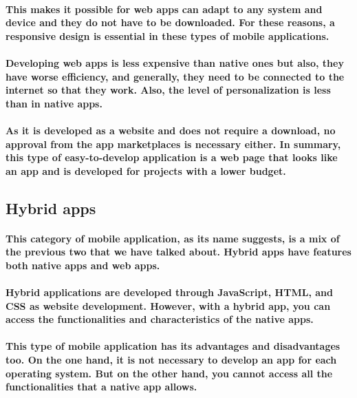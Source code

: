 \documentclass[12pt,a4paper]{article}
\begin{document}
    \paragraph{This makes it possible for web apps can adapt to any system and device and they do not have to be downloaded. For these reasons, a responsive design is essential in these types of mobile applications. }
    
    \paragraph{Developing web apps is less expensive than native ones but also, they have worse efficiency, and generally, they need to be connected to the internet so that they work. Also, the level of personalization is less than in native apps.}
    
    \paragraph{As it is developed as a website and does not require a download, no approval from the app marketplaces is necessary either. In summary, this type of easy-to-develop application is a web page that looks like an app and is developed for projects with a lower budget.}

    \subsection{Hybrid apps}

    \paragraph{This category of mobile application, as its name suggests, is a mix of the previous two that we have talked about. Hybrid apps have features both native apps and web apps.}
    
    \paragraph{Hybrid applications are developed through JavaScript, HTML, and CSS as website development. However, with a hybrid app, you can access the functionalities and characteristics of the native apps.}
    
    \paragraph{This type of mobile application has its advantages and disadvantages too. On the one hand, it is not necessary to develop an app for each operating system. But on the other hand, you cannot access all the functionalities that a native app allows.}
    
\end{document}
